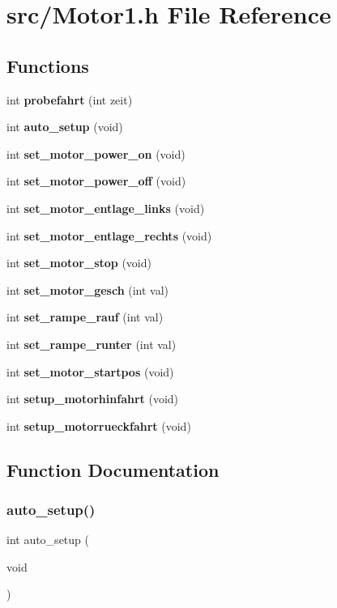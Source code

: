 \section{src/\+Motor1.h File Reference}
\label{_motor1_8h}
\subsection*{Functions}
\begin{DoxyCompactItemize}
\item 
int \textbf{ probefahrt} (int zeit)
\item 
int \textbf{ auto\+\_\+setup} (void)
\item 
int \textbf{ set\+\_\+motor\+\_\+power\+\_\+on} (void)
\item 
int \textbf{ set\+\_\+motor\+\_\+power\+\_\+off} (void)
\item 
int \textbf{ set\+\_\+motor\+\_\+entlage\+\_\+links} (void)
\item 
int \textbf{ set\+\_\+motor\+\_\+entlage\+\_\+rechts} (void)
\item 
int \textbf{ set\+\_\+motor\+\_\+stop} (void)
\item 
int \textbf{ set\+\_\+motor\+\_\+gesch} (int val)
\item 
int \textbf{ set\+\_\+rampe\+\_\+rauf} (int val)
\item 
int \textbf{ set\+\_\+rampe\+\_\+runter} (int val)
\item 
int \textbf{ set\+\_\+motor\+\_\+startpos} (void)
\item 
int \textbf{ setup\+\_\+motorhinfahrt} (void)
\item 
int \textbf{ setup\+\_\+motorrueckfahrt} (void)
\end{DoxyCompactItemize}


\subsection{Function Documentation}
\mbox{\label{_motor1_8h_a74908ae0608550a6106b2d9348f1cb86}} 
\subsubsection{auto\+\_\+setup()}
{\footnotesize\ttfamily int auto\+\_\+setup (\begin{DoxyParamCaption}\item[{void}]{ }\end{DoxyParamCaption})}

